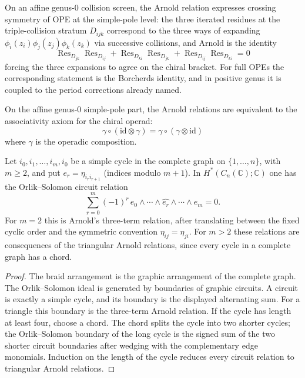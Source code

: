 \begin{remark}
\label{rem:arnold-crossing-symmetry}
On an affine genus-$0$ collision screen, the Arnold relation expresses
crossing symmetry of OPE at the simple-pole level: the three iterated
residues at the triple-collision stratum $D_{ijk}$ correspond to the
three ways of expanding $\phi_i(z_i)\phi_j(z_j)\phi_k(z_k)$ via
successive collisions, and Arnold is the identity
\begin{equation}
\operatorname{Res}_{D_{jk}}\operatorname{Res}_{D_{ij}}
+ \operatorname{Res}_{D_{ki}}\operatorname{Res}_{D_{jk}}
+ \operatorname{Res}_{D_{ij}}\operatorname{Res}_{D_{ki}} = 0
\end{equation}
forcing the three expansions to agree on the chiral bracket. For full
OPEs the corresponding statement is the Borcherds identity, and in
positive genus it is coupled to the period corrections already named.
\end{remark}

\begin{corollary}
\label{cor:arnold-operadic}
On the affine genus-$0$ simple-pole part, the Arnold relations are
equivalent to the associativity axiom for the chiral operad:
\begin{equation}
\gamma \circ (\text{id} \otimes \gamma) = \gamma \circ (\gamma \otimes \text{id})
\end{equation}
where $\gamma$ is the operadic composition.
\end{corollary}

\begin{theorem}
\label{thm:arnold-orlik-solomon}
Let $i_0,i_1,\ldots,i_m,i_0$ be a simple cycle in the complete graph on
$\{1,\ldots,n\}$, with $m\geq 2$, and put
$e_r=\eta_{i_r i_{r+1}}$ \textup{(}indices modulo $m+1$\textup{)}.
In $H^*(C_n(\mathbb{C});\mathbb{C})$ one has the Orlik--Solomon
circuit relation
\[
\sum_{r=0}^{m}
(-1)^r\,
e_0\wedge\cdots\wedge\widehat{e_r}\wedge\cdots\wedge e_m
=0.
\]
For $m=2$ this is Arnold's three-term relation, after translating
between the fixed cyclic order and the symmetric convention
$\eta_{ij}=\eta_{ji}$. For $m>2$ these relations are consequences of
the triangular Arnold relations, since every cycle in a complete graph
has a chord.
\end{theorem}

\begin{proof}
The braid arrangement is the graphic arrangement of the complete graph.
The Orlik--Solomon ideal is generated by boundaries of graphic
circuits. A circuit is exactly a simple cycle, and its boundary is the
displayed alternating sum. For a triangle this boundary is the
three-term Arnold relation. If the cycle has length at least four,
choose a chord. The chord splits the cycle into two shorter cycles; the
Orlik--Solomon boundary of the long cycle is the signed sum of the two
shorter circuit boundaries after wedging with the complementary edge
monomials. Induction on the length of the cycle reduces every circuit
relation to triangular Arnold relations.
\end{proof}

